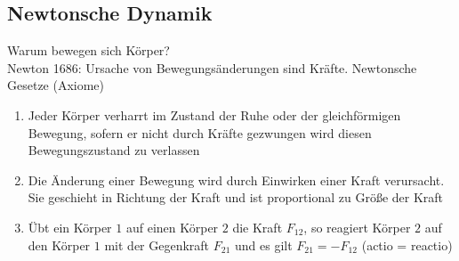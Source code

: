 \documentclass[11pt]{article}
\begin{document}
\subsection{Newtonsche Dynamik}
\label{sec-7-2}
Warum bewegen sich Körper?\\
   Newton 1686: Ursache von Bewegungsänderungen sind Kräfte.
Newtonsche Gesetze (Axiome)
\begin{enumerate}
\item Jeder Körper verharrt im Zustand der Ruhe oder der gleichförmigen Bewegung, sofern er nicht durch Kräfte gezwungen wird diesen Bewegungszustand zu verlassen
\item Die Änderung einer Bewegung wird durch Einwirken einer Kraft verursacht. Sie geschieht in Richtung der Kraft und ist proportional zu Größe der Kraft
\item Übt ein Körper $1$ auf einen Körper $2$ die Kraft $F_{12}$, so reagiert Körper $2$ auf den Körper $1$ mit der Gegenkraft $F_{21}$ und es gilt $F_{21} = -F_{12}$ (actio = reactio)
\end{enumerate}
\end{document}
